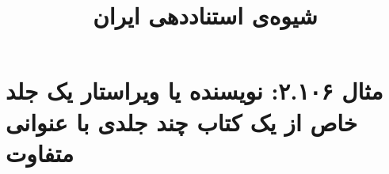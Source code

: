 \documentclass[a4paper,10pt]{article}
\begin{document}
\title{شیوه‌ی استناددهی ایران
 }
\author{}
\date{}
\maketitle



\section*{مثال ۲.۱۰۶: نویسنده یا ویراستار یک جلد خاص از یک کتاب چند جلدی با عنوانی متفاوت}

\cite{حقایق1377}\\
\cite{barrows1959}\\
\cite{مددی1385}\\
\cite{ray1959}\\






\end{document}
